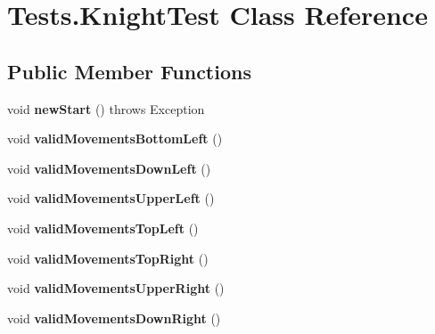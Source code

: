 \hypertarget{class_tests_1_1_knight_test}{}\section{Tests.\+Knight\+Test Class Reference}
\label{class_tests_1_1_knight_test}
\subsection*{Public Member Functions}
\begin{DoxyCompactItemize}
\item 
\mbox{\label{class_tests_1_1_knight_test_a062d6fedd7149d5b75682b31cac7789f}} 
void {\bfseries new\+Start} ()  throws Exception
\item 
\mbox{\label{class_tests_1_1_knight_test_a7ccc03bd5ca43d8369c65e3ef74da6d4}} 
void {\bfseries valid\+Movements\+Bottom\+Left} ()
\item 
\mbox{\label{class_tests_1_1_knight_test_a983e3fcdd2c1bf0276a29c8ee34ede50}} 
void {\bfseries valid\+Movements\+Down\+Left} ()
\item 
\mbox{\label{class_tests_1_1_knight_test_a9c9ca411e49f307179bb81aee65db1fa}} 
void {\bfseries valid\+Movements\+Upper\+Left} ()
\item 
\mbox{\label{class_tests_1_1_knight_test_a07459a46da7f61dec19f60da244a83e3}} 
void {\bfseries valid\+Movements\+Top\+Left} ()
\item 
\mbox{\label{class_tests_1_1_knight_test_ad1f43038c5dbf58e2ce7f6ad5ed6e598}} 
void {\bfseries valid\+Movements\+Top\+Right} ()
\item 
\mbox{\label{class_tests_1_1_knight_test_abff93a70489ce212e088244db84f53a0}} 
void {\bfseries valid\+Movements\+Upper\+Right} ()
\item 
\mbox{\label{class_tests_1_1_knight_test_a774f32ab19a81a1dd08ee4cdbfc13c04}} 
void {\bfseries valid\+Movements\+Down\+Right} ()
\item 

\end{DoxyCompactItemize}
